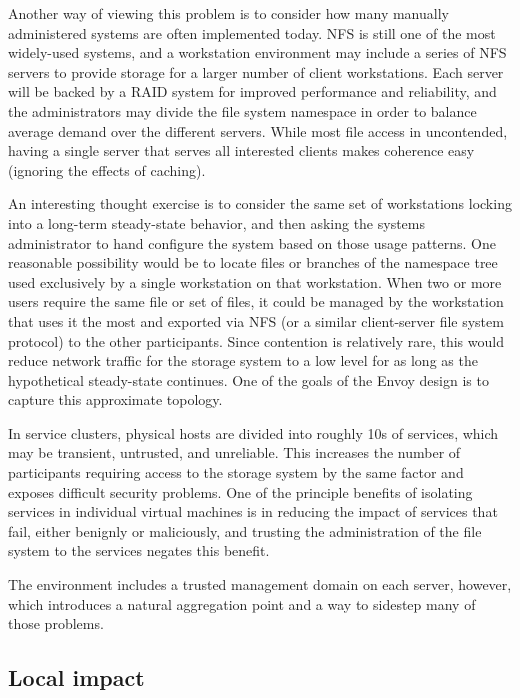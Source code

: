 Another way of viewing this problem is to consider how many manually administered systems are often implemented today. NFS \cite{callaghan} is still one of the most widely-used systems, and a workstation environment may include a series of NFS servers to provide storage for a larger number of client workstations. Each server will be backed by a RAID \cite{patterson} system for improved performance and reliability, and the administrators may divide the file system namespace in order to balance average demand over the different servers. While most file access in uncontended, having a single server that serves all interested clients makes coherence easy (ignoring the effects of caching).

An interesting thought exercise is to consider the same set of workstations locking into a long-term steady-state behavior, and then asking the systems administrator to hand configure the system based on those usage patterns. One reasonable possibility would be to locate files or branches of the namespace tree used exclusively by a single workstation on that workstation. When two or more users require the same file or set of files, it could be managed by the workstation that uses it the most and exported via NFS (or a similar client-server file system protocol) to the other participants. Since contention is relatively rare, this would reduce network traffic for the storage system to a low level for as long as the hypothetical steady-state continues. One of the goals of the Envoy design is to capture this approximate topology.

In service clusters, physical hosts are divided into roughly 10s of services, which may be transient, untrusted, and unreliable. This increases the number of participants requiring access to the storage system by the same factor and exposes difficult security problems. One of the principle benefits of isolating services in individual virtual machines is in reducing the impact of services that fail, either benignly or maliciously, and trusting the administration of the file system to the services negates this benefit.

The environment includes a trusted management domain on each server, however, which introduces a natural aggregation point and a way to sidestep many of those problems.

\subsection{Local impact}

